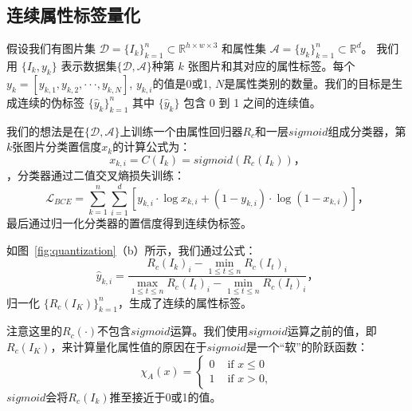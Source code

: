 \subsection{连续属性标签量化}
假设我们有图片集 $\mathcal{D} = \{I_k\}_{k=1}^n \subset \mathbb{R}^{h \times w \times 3}$ 和属性集 $\mathcal{A} = \{y_k\}_{k=1}^n \subset \mathbb{R}^{d}$。 我们用 $\{I_k, y_k\}$ 表示数据集$\{\mathcal{D}, \mathcal{A}\}$种第 $k$ 张图片和其对应的属性标签。每个$y_k=[y_{k,1}, y_{k,2}, \cdot \cdot \cdot ,y_{k,N}]$, $y_{k,i}$的值是0或1, $N$是属性类别的数量。我们的目标是生成连续的伪标签 $\{\hat{y}_k\}_{k=1}^n$ 其中 $\{\hat{y}_k\}$ 包含 0 到 1 之间的连续值。

我们的想法是在$\{\mathcal{D}, \mathcal{A}\}$上训练一个由属性回归器$R_c$和一层$sigmoid$组成分类器，第$k$张图片分类置信度$x_{k}$的计算公式为：
\begin{equation}
     x_{k,i} = C(I_k) = sigmoid(R_c(I_k))，
\end{equation}
，分类器通过二值交叉熵损失训练：
\begin{equation}
     \mathcal{L}_{BCE} = \sum_{k=1}^n \sum_{i=1}^d [y_{k,i} \cdot \log x_{k,i}+\left(1-y_{k,i}\right) \cdot \log \left(1-x_{k,i}\right)]，
\end{equation}
最后通过归一化分类器的置信度得到连续伪标签。

如图~\ref{fig:quantization}（b）所示，我们通过公式：
\begin{equation}
     \hat{y}_{k,i} = \frac{R_c(I_k)_i - \min \limits_{1 \leq t \leq n}R_c(I_t)_i}{\max \limits_{1 \leq t \leq n}R_c(I_t)_i - \min \limits_{1 \leq t \leq n}R_c(I_t)_i}，
     \label{eq3}
\end{equation}
归一化 $\{R_c(I_K)\}_{k=1}^n$，生成了连续的属性标签。

注意这里的$R_c(\cdot)$不包含$sigmoid$运算。我们使用$sigmoid$运算之前的值，即$R_c(I_K)$，来计算量化属性值的原因在于$sigmoid$是一个“软”的阶跃函数：
\begin{equation}
   \chi_{A}(x)=\left\{\begin{array}{ll}
      0 & \text { if } x \leq 0 \\
      1 & \text { if } x > 0,
      \end{array}\right.
\end{equation}
$sigmoid$会将$R_c(I_k)$推至接近于0或1的值。

